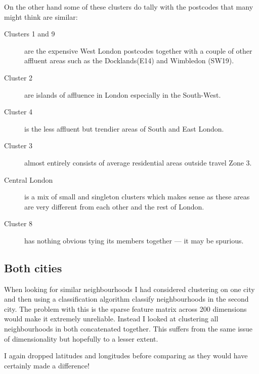 \documentclass[a4paper,12pt,final,UKenglish]{article}
\begin{document}
            On the other hand some of these clusters do tally with the postcodes that many might think are similar:
            \begin{description}
                \item[Clusters 1 and 9] are the expensive West London postcodes together with a couple of other affluent areas such as the Docklands(E14) and Wimbledon (SW19).
                \item[Cluster 2] are islands of affluence in London especially in the South-West.
                \item[Cluster 4] is the less affluent but trendier areas of South and East London.
                \item[Cluster 3] almost entirely consists of average residential areas outside travel Zone 3.
                \item[Central London] is a mix of small and singleton clusters which makes sense as these areas are very different from each other and the rest of London.
                \item[Cluster 8] has nothing obvious tying its members together --- it may be spurious.
            \end{description}
            
        \subsection{Both cities}
            When looking for similar neighbourhoods I had considered clustering on one city and then using a classification algorithm classify neighbourhoods in the second city.
            The problem with this is the sparse feature matrix across 200 dimensions would make it extremely unreliable.
            Instead I looked at clustering all neighbourhoods in both concatenated together.
            This suffers from the same issue of dimensionality but hopefully to a lesser extent.
            
            I again dropped latitudes and longitudes before comparing as they would have certainly made a difference!
            
\end{document}
